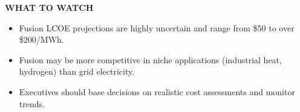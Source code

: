 \documentclass[10pt,a4paper]{article}
\begin{document}
\vspace{4pt}\noindent\begin{minipage}{\linewidth}
{\textcolor{BOGreen}{\scriptsize\bfseries WHAT TO WATCH}}\par\vspace{2pt}
{\footnotesize\begin{itemize}
\item Fusion LCOE projections are highly uncertain and range from \$50 to over \$200/MWh.
\item Fusion may be more competitive in niche applications (industrial heat, hydrogen) than grid electricity.
\item Executives should base decisions on realistic cost assessments and monitor trends.
\end{itemize}}
\end{minipage}
\label{chap:3:end}
\end{document}
